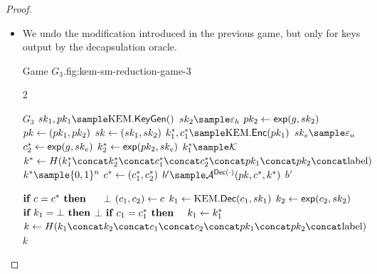 \begin{proof}
    \begin{itemize}
    \item[\textbf{Game 3}]
        We undo the modification introduced in the previous game, but only for keys output by the decapsulation oracle.
        \begin{gamefigure}{Game $G_3$.}{fig:kem-sm-reduction-game-3}
            \begin{games}{2}
                \begin{gameenv}{\game $G_3$}
                    \State $\sk_1, \pk_1 \sample \kem.\keygen()$
                    \State $\sk_2 \sample \honestexponent$
                    \State $pk_2 \leftarrow \textsf{exp}(g, sk_2)$
                    \State $pk \leftarrow (pk_1, pk_2)$
                    \State $sk \leftarrow (sk_1, sk_2)$
                    \State $k^*_1, c^*_1 \sample \kem.\enc(\pk_1)$
                    \State $\sk_e \sample \exponent$
                    \State $c^*_2 \leftarrow \textsf{exp}(g, sk_e)$
                    \State $k^*_2 \leftarrow \textsf{exp}(pk_2, sk_e)$
                    \State $k_1^* \sample \mathcal{K}$
                    \State $k^* \assign H(\hashinputchallenges)$
                    \State  $k^* \sample \bits^{n}$
                    \State $c^* \leftarrow (c_1^*, c_2^*)$
                    \State $b' \sample \adversary{A}^{\dec(\cdot)}(\pk, c^*, k^*)$
                    \State \Return $b'$
                \end{gameenv}
                \gamebreak
                \begin{gameenv}{\oracledec}
                    \State $\textbf{if } c = c^* \textbf{ then}$
                    \State $\quad$ \Return $\bot$
                    \State $(c_1, c_2) \leftarrow c$
                    \State $k_1 \leftarrow \text{KEM}.\textsf{Dec}(c_1, sk_1)$
                    \State $k_2 \leftarrow \textsf{exp}(c_2, sk_2)$
                    \State $\textbf{if } k_1 = \bot \textbf{ then}$
                    \State \quad \Return $\bot$
                    \State $\textbf{if } c_1 = c^*_1 \textbf{ then}$
                    \State $\quad k_1 \leftarrow k_1^*$
                    \State $k \assign H(\hashinput)$
                    \State \Return $k$
                \end{gameenv}
            \end{games}
        \end{gamefigure}


\end{itemize}
\end{proof}
